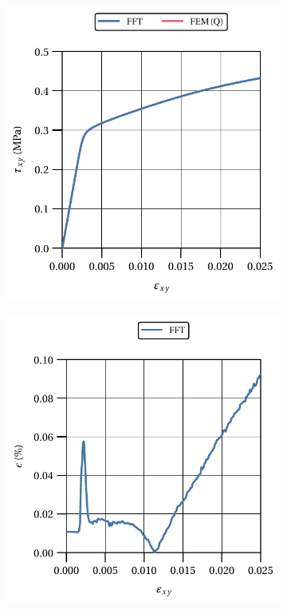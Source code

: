 \begin{figure}[hbt]
  \centering
  	\begin{subfigure}[b]{0.49\textwidth}
      \centering
      \includegraphics[width=\textwidth]{figures/von_mises_res_mat_small_strain_2D_shear_material_response}
      \caption{}
      \label{subfig:von_mises_res_mat_small_strain_2D_shear_material_response}
    \end{subfigure}
    \begin{subfigure}[b]{0.49\textwidth}
      \centering
      \includegraphics[width=\textwidth]{figures/von_mises_res_mat_small_strain_2D_shear_material_response_error}

\end{subfigure}
\end{figure}
